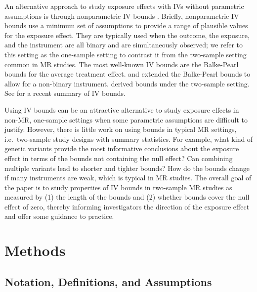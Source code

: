 \documentclass[
]{article}
\theoremstyle{plain}
\begin{document}
An alternative approach to study exposure effects with IVs without parametric assumptions is through nonparametric IV bounds \autocite{balke_bounds_1997,cheng_bounds_2006,manski_nonparametric_1990,richardson_ace_2014,robins_analysis_1989}. Briefly, nonparametric IV bounds use a minimum set of assumptions to provide a range of plausible values for the exposure effect. They are typically used when the outcome, the exposure, and the instrument are all binary and are simultaneously observed; we refer to this setting as the one-sample setting to contrast it from the two-sample setting common in MR studies. The most well-known IV bounds are the Balke-Pearl bounds \autocite{balke_bounds_1997} for the average treatment effect. \textcite{cheng_bounds_2006} and \textcite{richardson_ace_2014} extended the Balke-Pearl bounds to allow for a non-binary instrument. \textcite{ramsahai_causal_2012} derived bounds under the two-sample setting. See \textcite{swanson_partial_2018} for a recent summary of IV bounds.

Using IV bounds can be an attractive alternative to study exposure effects in non-MR, one-sample settings when some parametric assumptions are difficult to justify. However, there is little work on using bounds in typical MR settings, i.e.~two-sample study designs with summary statistics. For example, what kind of genetic variants provide the most informative conclusions about the exposure effect in terms of the bounds not containing the null effect? Can combining multiple variants lead to shorter and tighter bounds? How do the bounds change if many instruments are weak, which is typical in MR studies. The overall goal of the paper is to study properties of IV bounds in two-sample MR studies as measured by (1) the length of the bounds and (2) whether bounds cover the null effect of zero, thereby informing investigators the direction of the exposure effect and offer some guidance to practice.

\hypertarget{methods}{%
\section{\texorpdfstring{Methods \label{setup}}{Methods }}\label{methods}}

\hypertarget{notation-definitions-and-assumptions}{%
\subsection{Notation, Definitions, and Assumptions}\label{notation-definitions-and-assumptions}}
\end{document}

